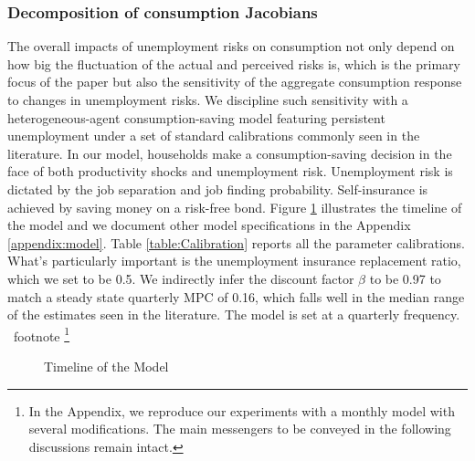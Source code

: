 \subsubsection*{Decomposition of consumption Jacobians}

 The overall impacts of unemployment risks on consumption not only depend on how big the fluctuation of the actual and perceived risks is, which is the primary focus of the paper but also the sensitivity of the aggregate consumption response to changes in unemployment risks. We discipline such sensitivity with a heterogeneous-agent consumption-saving model featuring persistent unemployment under a set of standard calibrations commonly seen in the literature. In our model, households make a consumption-saving decision in the face of both productivity shocks and unemployment risk. Unemployment risk is dictated by the job separation and job finding probability. Self-insurance is achieved by saving money on a risk-free bond. Figure \ref{fig:model_timeline} illustrates the timeline of the model and we document other model specifications in the Appendix \ref{appendix:model}. Table \ref{table:Calibration} reports all the parameter calibrations. What's particularly important is the unemployment insurance replacement ratio, which we set to be 0.5. We indirectly infer the discount factor $\beta$ to be 0.97 to match a steady state quarterly MPC of 0.16, which falls well in the median range of the estimates seen in the literature. The model is set at a quarterly frequency. \ footnote \footnote{In the Appendix, we reproduce our experiments with a monthly model with several modifications. The main messengers to be conveyed in the following discussions remain intact.} 


\begin{figure}[pt]
    \centering
    \caption{Timeline of the Model}
    \label{fig:model_timeline}
\end{figure}

